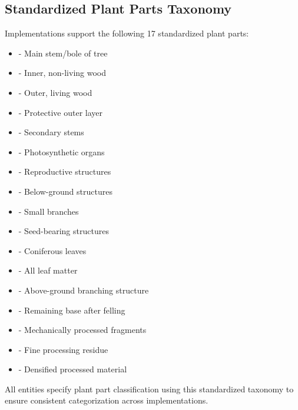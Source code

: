 
\subsection{Standardized Plant Parts Taxonomy}
\label{sec:plant-parts-taxonomy}

Implementations \MUST{} support the following 17 standardized plant parts:

\begin{itemize}
    \item \textbf{} - Main stem/bole of tree
    \item \textbf{} - Inner, non-living wood
    \item \textbf{} - Outer, living wood
    \item \textbf{} - Protective outer layer
    \item \textbf{} - Secondary stems
    \item \textbf{} - Photosynthetic organs
    \item \textbf{} - Reproductive structures
    \item \textbf{} - Below-ground structures
    \item \textbf{} - Small branches
    \item \textbf{} - Seed-bearing structures
    \item \textbf{} - Coniferous leaves
    \item \textbf{} - All leaf matter
    \item \textbf{} - Above-ground branching structure
    \item \textbf{} - Remaining base after felling
    \item \textbf{} - Mechanically processed fragments
    \item \textbf{} - Fine processing residue
    \item \textbf{} - Densified processed material
\end{itemize}

\begin{normative}[title=Plant Part Classification Requirements]
All \TRU{} entities \MUST{} specify plant part classification using this standardized taxonomy to ensure consistent categorization across implementations.
\end{normative}